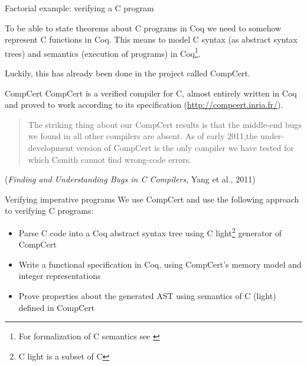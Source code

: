 \documentclass[10pt,usenames,dvipsnames,landscape]{beamer}
\begin{document}
\begin{frame}{Factorial example: verifying a C program}

    To be able to state theorems about C programs in Coq we need to somehow represent C functions in Coq. This means  to model C syntax (as abstract syntax trees) and semantics (execution of programs) in Coq\footnote{For formalization of C semantics see \cite{Blazy09mechanizedsemantics}}.

    Luckily, this has already been done in the project called CompCert.
    \end{frame}
    
    \begin{frame}{CompCert}
    CompCert is a verified compiler for C, almost entirely written in Coq and proved to work according to its specification (\url{http://compcert.inria.fr/}).

    \begin{quote}
      The striking thing about our CompCert results is that the middle-end bugs we found in all other compilers are absent. As of early 2011,the under-development version of CompCert is the only compiler we have tested for which Csmith cannot find wrong-code errors.
    \end{quote} ({\it Finding and Understanding Bugs in C Compilers}, Yang et al., 2011)

\end{frame}
    
\begin{frame}{Verifying imperative programs}
    We use CompCert and use the following approach to verifying C programs:
  \begin{itemize}
  \item Parse C code into a Coq abstract syntax tree using C light\footnote{C light is a subset of C} generator of CompCert
  \item Write a functional specification in Coq, using CompCert's memory model and integer representations
  \item Prove properties about the generated AST  using semantics of C (light) defined in CompCert
\end{itemize}
\end{frame}
\end{document}
